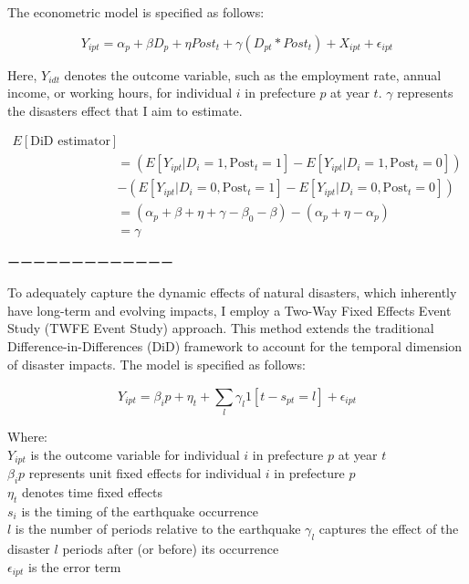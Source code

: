 \documentclass[12pt,halfline,a4paper]{ouparticle}
\begin{document}
The econometric model is specified as follows:

\begin{equation}
Y_{ipt} = \alpha_{p} + \beta D_{p} + \eta Post_{t} + \gamma (D_{pt} * Post_{t}) + X_{ipt} + \epsilon_{ipt}
\end{equation}

Here, \( Y_{idt} \) denotes the outcome variable, such as the employment rate, annual income, or working hours, for individual \( i \) in prefecture \( p \) at year \( t \). \( \gamma \) represents the disasters effect that I aim to estimate. 


\begin{equation}
\begin{aligned}
E[\text{DiD estimator}] \\
&= (E[Y_{ipt}|D_i = 1, \text{Post}_t = 1] - E[Y_{ipt}|D_i = 1, \text{Post}_t = 0]) \\
&- (E[Y_{ipt}|D_i = 0, \text{Post}_t = 1] - E[Y_{ipt}|D_i = 0, \text{Post}_t = 0]) \\
&= (\alpha_{p} + \beta + \eta + \gamma - \beta_0 - \beta) - (\alpha_{p} + \eta - \alpha_{p}) \\
&= \gamma
\end{aligned}
\end{equation}





ーーーーーーーーーーーーー

To adequately capture the dynamic effects of natural disasters, which inherently have long-term and evolving impacts, I employ a Two-Way Fixed Effects Event Study (TWFE Event Study) approach. This method extends the traditional Difference-in-Differences (DiD) framework to account for the temporal dimension of disaster impacts. The model is specified as follows:

\begin{equation}
Y_{ipt} = \beta_ip + \eta_t + \sum_{l}^{} \gamma_l 1 [t-s_{pt} = l] + \epsilon_{ipt}
\end{equation}

Where: \\
$Y_{ipt}$ is the outcome variable for individual \( i \) in prefecture \( p \) at year \( t \) \\
$\beta_ip$ represents unit fixed effects for individual \( i \) in prefecture \( p \) \\
$\eta_t$ denotes time fixed effects \\
$s_{i}$ is the timing of the earthquake occurrence \\
$l$ is the number of periods relative to the earthquake
$\gamma_l$ captures the effect of the disaster $l$ periods after (or before) its occurrence \\
$\epsilon_{ipt}$ is the error term
\end{document}
